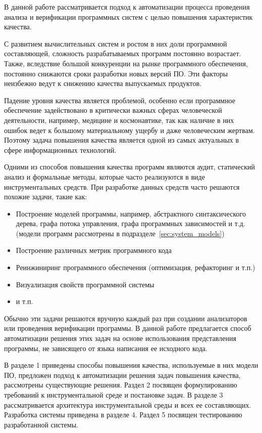 \intro


В данной работе рассматривается подход к автоматизации процесса проведения
анализа и верификации программных систем с целью повышения характеристик
качества.

С развитием вычислительных систем и ростом в них доли программной составляющей,
сложность разрабатываемых программ постоянно возрастает. Также, вследствие
большой конкуренции на рынке программного обеспечения, постоянно снижаются сроки
разработки новых версий ПО. Эти факторы неизбежно ведут к снижению качества
выпускаемых продуктов.

Падение уровня качества является проблемой, особенно если программное
обеспечение задействовано в критически важных сферах человеческой деятельности,
например, медицине и космонавтике, так как наличие в них ошибок ведет к большому
материальному ущербу и даже человеческим жертвам. Поэтому задача повышения
качества является одной из самых актуальных в сфере информационных технологий.

Одними из способов повышения качества программ являются аудит, статический
анализ и формальные методы, которые часто реализуются в виде инструментальных
средств. При разработке данных средств часто решаются похожие задачи, такие
как:

\begin{itemize}
    \item Построение моделей программы, например, абстрактного синтаксического
    дерева, графа потока управления, графа программных зависимостей и т.д.
    (модели программ рассмотрены в подразделе~\ref{sec:system_models})
    \item Построение различных метрик программного кода
    \item Реинжиниринг программного обеспечения (оптимизация, рефакторинг и т.п.)
    \item Визуализация свойств программной системы
    \item и т.п.
\end{itemize}

Обычно эти задачи решаются вручную каждый раз при создании анализаторов или
проведения верификации программы. В данной работе предлагается способ
автоматизации решения этих задач на основе использования представления
программы, не зависящего от языка написания ее исходного кода.

В разделе 1 приведены способы повышения качества, используемые в них модели ПО,
предложен подход к автоматизации решения задач повышения качества, рассмотрены
существующие решения. Раздел 2 посвящен формулированию требований к
инструментальной среде и постановке задач. В разделе 3 рассматривается
архитектура инструментальной среды и всех ее составляющих. Разработка системы
приведена в разделе 4. Раздел 5 посвящен тестированию разработанной системы.
